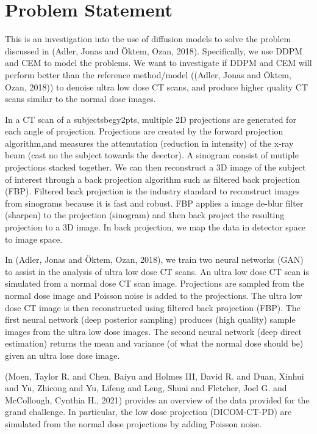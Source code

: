 \documentclass[a4paper, 11pt]{article}
\begin{document}
\section{Problem Statement}
\label{sec:orgd879c91}
This is an investigation into the use of diffusion models to solve the problem discussed in (Adler, Jonas and Öktem, Ozan, 2018). Specifically, we use DDPM and CEM to model the problems. We want to investigate if DDPM and CEM will perform better than the reference method/model ((Adler, Jonas and Öktem, Ozan, 2018)) to denoise ultra low dose CT scans, and produce higher quality CT scans similar to the normal dose images.

In a CT scan of a subjectsbegy2pts, multiple 2D projections are generated for each angle of projection. Projections are created by the forward projection algorithm,and measures the attenutation (reduction in intensity) of the x-ray beam (cast no the subject towards the deector). A sinogram consist of mutiple projections stacked together. We can then reconstruct a 3D image of the subject of interest through a back projection algorithm such as filtered back projection (FBP). Filtered back projection is the industry standard to reconstruct images from sinograms because it is fast and robust. FBP applies a image de-blur filter (sharpen) to the projection (sinogram) and then back project the resulting projection to a 3D image. In back projection, we map the data in detector space to image space.



In (Adler, Jonas and Öktem, Ozan, 2018), we train two neural networks (GAN) to assist in the analysis of ultra low dose CT scans. An ultra low dose CT scan is simulated from a normal dose CT scan image. Projections are sampled from the normal dose image and Poisson noise is added to the projections. The ultra low dose CT image is then reconstructed using filtered back projection (FBP). The first neural network (deep posterior sampling) produces (high quality) sample images from the ultra low dose images. The second neural network (deep direct estimation) returns the mean and variance (of what the normal dose should be) given an ultra lose dose image.

(Moen, Taylor R. and Chen, Baiyu and Holmes III, David R. and Duan, Xinhui and Yu, Zhicong and Yu, Lifeng and Leng, Shuai and Fletcher, Joel G. and McCollough, Cynthia H., 2021) provides an overview of the data provided for the grand challenge. In particular, the low dose projection (DICOM-CT-PD) are simulated from the normal dose projections by adding Poisson noise.
\end{document}
